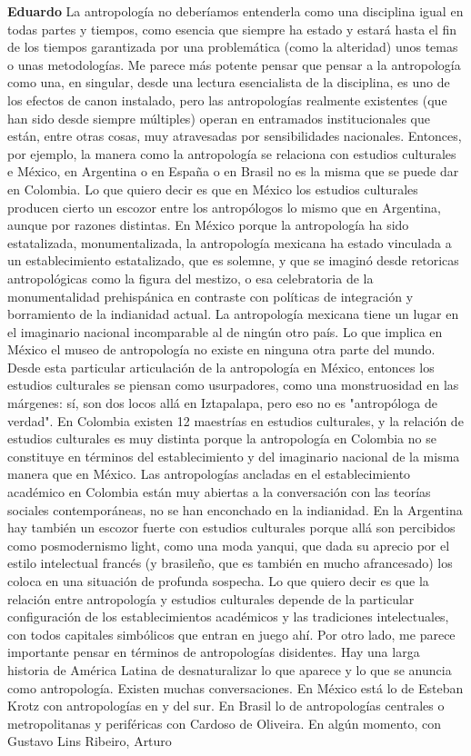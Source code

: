 \documentclass[
  spanish,
  11pt,
  a4paper,
]{scrbook}
\newenvironment{transcripcion}{
    \begin{list}{}{
        \setlength{\leftmargin}{1.5em}  %
        \setlength{\rightmargin}{0em}
        \setlength{\itemsep}{0.2em}     %
        \setlength{\parsep}{0.0em}
        \setlength{\listparindent}{0pt}
    }
}{
    \end{list}
}
\newcommand{\personaje}[1]{\textbf{#1}\quad}
\begin{document}
\begin{transcripcion}
\item \personaje{Eduardo} La antropología no deberíamos entenderla como una disciplina igual en todas partes y tiempos, como esencia que siempre ha estado y estará hasta el fin de los tiempos garantizada por una problemática (como la alteridad) unos temas o unas metodologías. Me parece más potente pensar que pensar a la antropología como una, en singular, desde una lectura esencialista de la disciplina, es uno de los efectos de canon instalado, pero las antropologías realmente existentes (que han sido desde siempre múltiples) operan en entramados institucionales que están, entre otras cosas, muy atravesadas por sensibilidades nacionales. Entonces, por ejemplo, la manera como la antropología se relaciona con estudios culturales e México, en Argentina o en España o en Brasil no es la misma que se puede dar en Colombia. Lo que quiero decir es que en México los estudios culturales producen cierto un escozor entre los antropólogos lo mismo que en Argentina, aunque por razones distintas. En México porque la antropología ha sido estatalizada, monumentalizada, la antropología mexicana ha estado vinculada a un establecimiento estatalizado, que es solemne, y que se imaginó desde retoricas antropológicas como la figura del mestizo, o esa celebratoria de la monumentalidad prehispánica en contraste con políticas de integración y borramiento de la indianidad actual. La antropología mexicana tiene un lugar en el imaginario nacional incomparable al de ningún otro país. Lo que implica en México el museo de antropología no existe en ninguna otra parte del mundo. Desde esta particular articulación de la antropología en México, entonces los estudios culturales se piensan como usurpadores, como una monstruosidad en las márgenes: sí, son dos locos allá en Iztapalapa, pero eso no es "antropóloga de verdad". En Colombia existen 12 maestrías en estudios culturales, y la relación de estudios culturales es muy distinta porque la antropología en Colombia no se constituye en términos del establecimiento y del imaginario nacional de la misma manera que en México. Las antropologías ancladas en el establecimiento académico en Colombia están muy abiertas a la conversación con las teorías sociales contemporáneas, no se han enconchado en la indianidad. En la Argentina hay también un escozor fuerte con estudios culturales porque allá son percibidos como posmodernismo light, como una moda yanqui, que dada su aprecio por el estilo intelectual francés (y brasileño, que es también en mucho afrancesado) los coloca en una situación de profunda sospecha. Lo que quiero decir es que la relación entre antropología y estudios culturales depende de la particular configuración de los establecimientos académicos y las tradiciones intelectuales, con todos capitales simbólicos que entran en juego ahí. Por otro lado, me parece importante pensar en términos de antropologías disidentes. Hay una larga historia de América Latina de desnaturalizar lo que aparece y lo que se anuncia como antropología. Existen muchas conversaciones. En México está lo de Esteban Krotz con antropologías en y del sur. En Brasil lo de antropologías centrales o metropolitanas y periféricas con Cardoso de Oliveira. En algún momento, con Gustavo Lins Ribeiro, Arturo 
\end{transcripcion}
\end{document}
